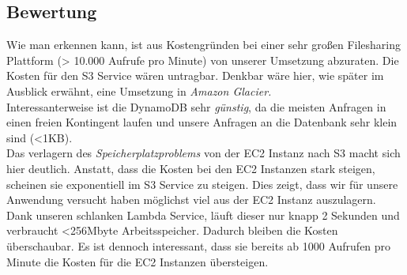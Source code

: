 \documentclass[a4paper, 12pt]{scrreprt}
\renewcommand\_{\textunderscore\allowbreak}
\begin{document}
\subsection{Bewertung}
Wie man erkennen kann, ist aus Kostengründen bei einer sehr großen Filesharing Plattform (> 10.000 Aufrufe pro Minute) von unserer Umsetzung abzuraten. Die Kosten für den S3 Service wären untragbar. Denkbar wäre hier, wie später im Ausblick erwähnt, eine Umsetzung in \emph{Amazon Glacier.}\\
Interessanterweise ist die DynamoDB sehr \emph{günstig}, da die meisten Anfragen in einen freien Kontingent laufen und unsere Anfragen an die Datenbank sehr klein sind (<1KB). \\
Das verlagern des \textit{Speicherplatzproblems} von der EC2 Instanz nach S3 macht sich hier deutlich. Anstatt, dass die Kosten bei den EC2 Instanzen stark steigen, scheinen sie exponentiell im S3 Service zu steigen. Dies zeigt, dass wir für unsere Anwendung versucht haben möglichst viel aus der EC2 Instanz auszulagern. \\
Dank unseren schlanken Lambda Service, läuft dieser nur knapp 2 Sekunden und verbraucht <256Mbyte Arbeitsspeicher. Dadurch bleiben die Kosten überschaubar. Es ist dennoch interessant, dass sie bereits ab 1000 Aufrufen pro Minute die Kosten für die EC2 Instanzen übersteigen. 




\end{document}

